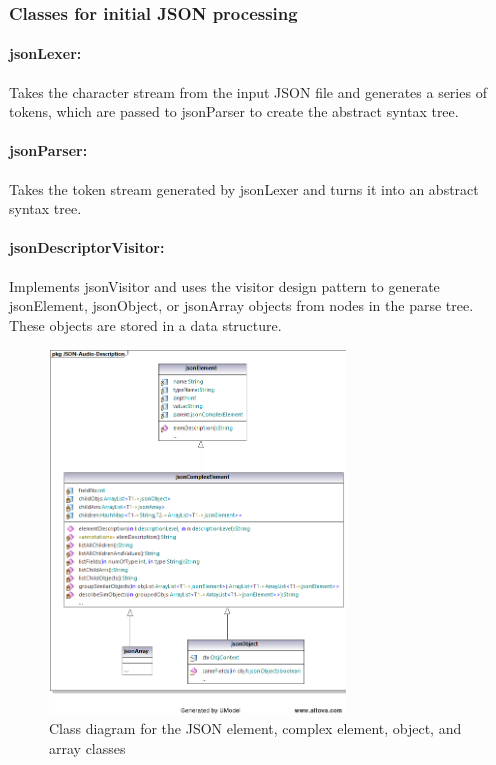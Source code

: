 \documentclass{l4proj}
\begin{document}
\subsubsection{Classes for initial JSON processing}\hfill

\paragraph{\textbf{jsonLexer}:} Takes the character stream from the input JSON file and generates a series of tokens, which are passed to jsonParser to create the abstract syntax tree.

\paragraph{\textbf{jsonParser}:} Takes the token stream generated by jsonLexer and turns it into an abstract syntax tree.

\paragraph{\textbf{jsonDescriptorVisitor}:} Implements jsonVisitor and uses the visitor design pattern to generate jsonElement, jsonObject, or jsonArray objects from nodes in the parse tree. These objects are stored in a data structure.


\begin{figure}[h]
    \centering
    \includegraphics[width=0.7\textwidth]{dissertation/images/JSONElements class diagram.png}
    \caption{Class diagram for the JSON element, complex element, object, and array classes}
    \label{fig:JSON element class diagram}
\end{figure}
\end{document}
